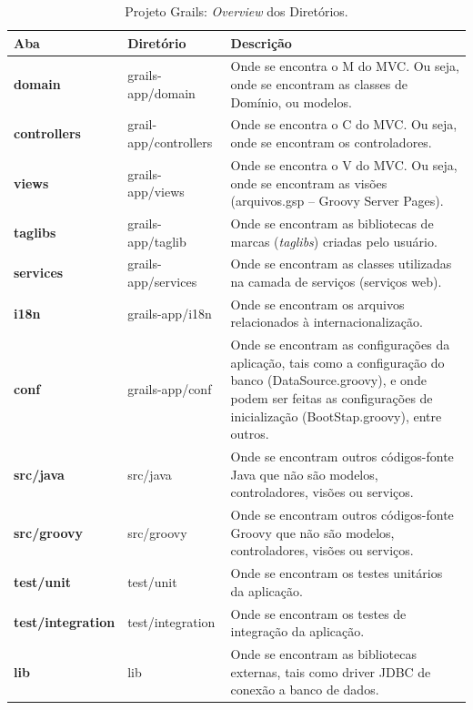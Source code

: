 \begin{table}[htbp]
\centering
\begin{tabular}{p{2.5cm} | p{3.5cm} | p{7.5cm}}

\toprule 
\rowcolor{Gray} 

\textbf{Aba} & \textbf{Diretório} & \textbf{Descrição}\\ 
\midrule
{\bf domain} & grails-app/domain & Onde se encontra o M do MVC. Ou seja, onde se
encontram as classes de Domínio, ou modelos.  \\ 
\midrule
{\bf controllers}  & grail-app/controllers &  Onde se encontra  o C do  MVC.  Ou
seja, onde se encontram os controladores.  \\ 
\midrule
{\bf views} & grails-app/views & Onde se  encontra o V do MVC.  Ou seja, onde se
encontram as visões (arquivos.gsp – Groovy Server Pages). \\ 
\midrule
{\bf taglibs} &  grails-app/taglib & Onde se encontram  as bibliotecas de marcas
({\it taglibs}) criadas pelo usuário. \\ 
\midrule
{\bf services} &  grails-app/services & Onde se encontram  as classes utilizadas
na camada de serviços (serviços web). \\ 
\midrule 
{\bf  i18n} & grails-app/i18n  & Onde  se encontram  os arquivos  relacionados à
internacionalização.  \\ 
\midrule
{\bf conf} & grails-app/conf &  Onde se encontram as configurações da aplicação,
tais como a  configuração do banco (DataSource.groovy), e  onde podem ser feitas
as configurações de inicialização (BootStap.groovy), entre outros. \\ 
\midrule
{\bf src/java} & src/java & Onde  se encontram outros códigos-fonte Java que não
são modelos, controladores, visões ou serviços. \\ 
\midrule   
{\bf src/groovy}  & src/groovy &  Onde se encontram outros  códigos-fonte Groovy
que não são modelos, controladores, visões ou serviços. \\ 
\midrule
{\bf  test/unit}  &  test/unit  &  Onde  se encontram  os  testes  unitários  da
aplicação.  \\ 
\midrule
{\bf  test/integration} &  test/integration &  Onde  se encontram  os testes  de
integração da aplicação.  \\ 
\midrule
{\bf lib}  & lib & Onde se  encontram as bibliotecas externas,  tais como driver
JDBC de conexão a banco de dados. \\ 
\bottomrule
\end{tabular}
\caption{Projeto Grails: {\it Overview} dos Diretórios.}
\label{grailsTbl}
\end{table}

